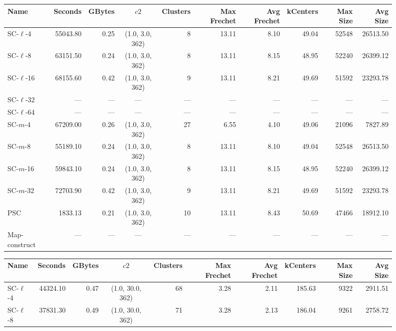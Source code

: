 \clearpage
\newpage 
%
\clearpage
\begin{figure} \begin{center}
    \begin{minipage}{\textwidth}
{
\begin{tabular}{@{}lrrcrrrrrr@{}}
    \toprule
    Name & Seconds & GBytes & $c2$ & Clusters & Max Frechet & Avg Frechet & kCenters & Max Size & Avg Size\\
    \midrule
    SC-$\ell$-4 & 55043.80 & 0.25 & (1.0, 3.0, 362) & 8 & 13.11 & 8.10 & 49.04 & 52548 & 26513.50\\
    SC-$\ell$-8 & 63151.50 & 0.24 & (1.0, 3.0, 362) & 8 & 13.11 & 8.15 & 48.95 & 52240 & 26399.12\\
    SC-$\ell$-16 & 68155.60 & 0.42 & (1.0, 3.0, 362) & 9 & 13.11 & 8.21 & 49.69 & 51592 & 23293.78\\
    SC-$\ell$-32 & --- & --- & --- & --- & --- & --- & --- & --- & ---\\
    SC-$\ell$-64 & --- & --- & --- & --- & --- & --- & --- & --- & ---\\
    SC-$m$-4 & 67209.00 & 0.26 & (1.0, 3.0, 362) & 27 & 6.55 & 4.10 & 49.06 & 21096 & 7827.89\\
    SC-$m$-8 & 55189.10 & 0.24 & (1.0, 3.0, 362) & 8 & 13.11 & 8.10 & 49.04 & 52548 & 26513.50\\
    SC-$m$-16 & 59843.10 & 0.24 & (1.0, 3.0, 362) & 8 & 13.11 & 8.15 & 48.95 & 52240 & 26399.12\\
    SC-$m$-32 & 72703.90 & 0.42 & (1.0, 3.0, 362) & 9 & 13.11 & 8.21 & 49.69 & 51592 & 23293.78\\
    PSC & 1833.13 & 0.21 & (1.0, 3.0, 362) & 10 & 13.11 & 8.43 & 50.69 & 47466 & 18912.10\\
    Map-construct & --- & --- & --- & --- & --- & --- & --- & --- & ---\\
    \bottomrule
\end{tabular}
}
{
\begin{tabular}{@{}lrrcrrrrrr@{}}
    \toprule
    Name & Seconds & GBytes & $c2$ & Clusters & Max Frechet & Avg Frechet & kCenters & Max Size & Avg Size\\
    \midrule
    SC-$\ell$-4 & 44324.10 & 0.47 & (1.0, 30.0, 362) & 68 & 3.28 & 2.11 & 185.63 & 9322 & 2911.51\\
    SC-$\ell$-8 & 37831.30 & 0.49 & (1.0, 30.0, 362) & 71 & 3.28 & 2.13 & 186.04 & 9261 & 2758.72\\

\end{tabular}}
\end{minipage}
\end{center}
\end{figure}
